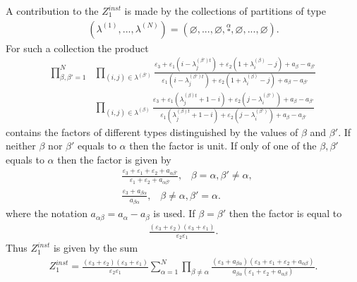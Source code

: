 \documentclass[12pt]{article}
\numberwithin{equation}{section}
\theoremstyle{definition}
\begin{document}
A contribution to the $Z^{inst}_{1}$ is made by the collections of partitions of type
\begin{align*}
(\lambda^{(1)}, ..., \lambda^{(N)}) = (\varnothing, ..., \varnothing, \stackrel{\alpha}{\square}, \varnothing, ..., \varnothing).
\end{align*}
For such a collection the product
\begin{align*}
\prod\limits_{\beta , \beta' = 1}^{N} &\prod\limits_{(i, j) \in \lambda^{(\beta')}} \frac{\varepsilon_3 + \varepsilon_1 (i - \lambda_{j}^{(\beta')t}) + \varepsilon_2 (1 + \lambda_{i}^{(\beta)} - j) + a_{\beta} - a_{\beta'}}{\varepsilon_1 (i - \lambda_{j}^{(\beta')t}) + \varepsilon_2 (1 + \lambda_{i}^{(\beta)} - j) + a_{\beta} - a_{\beta'}} \\
    &\prod\limits_{(i, j) \in \lambda^{(\beta)}} \frac{\varepsilon_3 + \varepsilon_1 (\lambda_{j}^{(\beta)t} + 1 - i) + \varepsilon_2 (j -\lambda_{i}^{(\beta')}) + a_{\beta} - a_{\beta'}}{\varepsilon_1 (\lambda_{j}^{(\beta)t} + 1 - i) + \varepsilon_2 (j -\lambda_{i}^{(\beta')}) + a_{\beta} - a_{\beta'}}
\end{align*}
contains the factors of different types distinguished by the values of $\beta$ and $\beta'$. If neither $\beta$ nor $\beta'$ equals to $\alpha$ then the factor is unit. If only of one of the $\beta, \beta'$ equals to $\alpha$ then the factor is given by
\begin{align*}
&\frac{\varepsilon_{3} + \varepsilon_{1} + \varepsilon_{2} + a_{\alpha \beta'}}{\varepsilon_{1} + \varepsilon_{2} + a_{\alpha \beta'} }, \;\;\; \beta = \alpha, \beta' \neq \alpha,\\
&\frac{\varepsilon_{3} + a_{\beta \alpha} }{a_{\beta \alpha} }, \;\;\; \beta \neq \alpha, \beta' = \alpha.
\end{align*}
 where the notation $a_{\alpha \beta} = a_{\alpha} - a_{\beta}$ is used.
If $\beta = \beta'$ then the factor is equal to 
\begin{align*}
\frac{(\varepsilon_{3} + \varepsilon_{2})(\varepsilon_{3} + \varepsilon_{1})}{\varepsilon_{2} \varepsilon_{1}}.
\end{align*}
Thus $Z_{1}^{inst}$ is given by the sum
\begin{align}\label{Z1inst}
Z^{inst}_{1} =  \frac{(\varepsilon_{3} + \varepsilon_{2})(\varepsilon_{3} + \varepsilon_{1})}{\varepsilon_{2} \varepsilon_{1}} \sum\limits_{\alpha = 1}^{N} \prod\limits_{\beta \neq \alpha}\frac{(\varepsilon_{3} + a_{\beta \alpha} )(\varepsilon_{3} + \varepsilon_{1} + \varepsilon_{2} + a_{\alpha \beta} )}{a_{\beta \alpha} (\varepsilon_{1} + \varepsilon_{2} + a_{\alpha \beta} )}.
\end{align}
\end{document}
